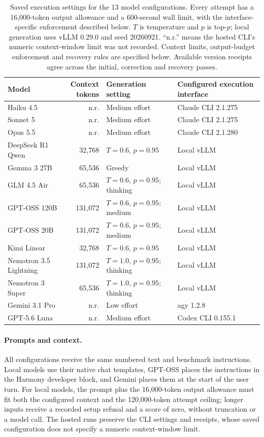 \begin{table}[h]
\centering\small
\setlength{\tabcolsep}{3pt}
\begin{tabular}{lrll}
\toprule
Model & \shortstack{Context\\tokens} & Generation setting & Configured execution interface\\
\midrule
Haiku 4.5 & n.r. & Medium effort & Claude CLI 2.1.275\\
Sonnet 5 & n.r. & Medium effort & Claude CLI 2.1.275\\
Opus 5.5 & n.r. & Medium effort & Claude CLI 2.1.280\\
DeepSeek R1 Qwen & 32,768 & $T=0.6$, $p=0.95$ & Local vLLM\\
Gemma 3 27B & 65,536 & Greedy & Local vLLM\\
GLM 4.5 Air & 65,536 & $T=0.6$, $p=0.95$; thinking & Local vLLM\\
GPT-OSS 120B & 131,072 & $T=0.6$, $p=0.95$; medium & Local vLLM\\
GPT-OSS 20B & 131,072 & $T=0.6$, $p=0.95$; medium & Local vLLM\\
Kimi Linear & 32,768 & $T=0.6$, $p=0.95$ & Local vLLM\\
Nemotron 3.5 Lightning & 131,072 & $T=1.0$, $p=0.95$; thinking & Local vLLM\\
Nemotron 3 Super & 65,536 & $T=1.0$, $p=0.95$; thinking & Local vLLM\\
Gemini 3.1 Pro & n.r. & Low effort & agy 1.2.8\\
GPT-5.6 Luna & n.r. & Medium effort & Codex CLI 0.155.1\\
\bottomrule
\end{tabular}
\caption{Saved execution settings for the 13 model configurations. Every attempt has a 16,000-token output allowance and a 600-second wall limit, with the interface-specific enforcement described below. $T$ is temperature and $p$ is top-$p$; local generation uses vLLM 0.29.0 and seed 20260921. ``n.r.'' means the hosted CLI's numeric context-window limit was not recorded. Context limits, output-budget enforcement and recovery rules are specified below. Available version receipts agree across the initial, correction and recovery passes.}
\label{tab:ccl-execution-settings}
\end{table}

\paragraph{Prompts and context.}
All configurations receive the same numbered text and benchmark instructions. Local models use their native chat templates, GPT-OSS places the instructions in the Harmony developer block, and Gemini places them at the start of the user turn. For local models, the prompt plus the 16,000-token output allowance must fit both the configured context and the 120,000-token attempt ceiling; longer inputs receive a recorded setup refusal and a score of zero, without truncation or a model call. The hosted runs preserve the CLI settings and receipts, whose saved configuration does not specify a numeric context-window limit.

